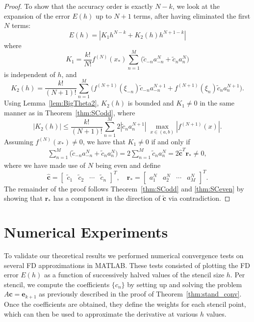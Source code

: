 \documentclass[12pt]{article}
\newcommand{\xstar}{x_*}
\newcommand{\rstar}{r_*}
\begin{document}
\begin{proof}
To show that the accuracy order is exactly $N-k$, we look at the expansion of the error $E(h)$ up to $N+1$ terms, after having eliminated the first $N$ terms:
\[
	E(h) = \left| K_1h^{N-k} + K_2(h)h^{N+1-k} \right|
\]
where
\[
	K_1 = \frac{k!}{N!}f^{(N)}(\xstar) \sum_{n=1}^M \Big( \tilde c_{-n} a_{-n}^N + \tilde c_n a_n^{N} \Big)
\]
is independent of $h$, and
\[
	K_2(h) = \frac{k!}{(N+1)!} \sum_{n=1}^{M} 
	\Big( 
		f^{(N+1)}(\xi_{-n})\tilde c_{-n}a_{-n}^{N+1} + 
		f^{(N+1)}(\xi_n)\tilde c_na_n^{N+1}
	\Big).
\]
Using Lemma~\ref{lem:BigTheta2}, $K_2(h)$ is bounded and $K_1\ne 0$ in the same manner as in Theorem~\ref{thm:SCodd}, where
\[
	|K_2(h)| \le \frac{k!}{(N+1)!}
	\sum_{n=1}^M 
		2|\tilde c_na_n^{N+1}| 
	\; \max_{x\in(a,b)}\left|f^{(N+1)}(x)\right|.
\]
Assuming $f^{(N)}(\xstar)\neq 0$, we have that $K_1\neq 0$ if and only if
\begin{align*}
	\sum_{n=1}^M \Big( \tilde c_{-n} a_{-n}^{N}  + \tilde c_n a_n^{N} \Big)
	= 2\sum_{n=1}^M \tilde c_n a_n^{N}
	= 2 \hat{\mathbf c}^T \mathbf \rstar
	\neq 0,
\end{align*}
where we have made use of $N$ being even and define
\[
	\hat{\mathbf c} = 
		\begin{bmatrix}
		\tilde c_1 & \tilde c_2&  \cdots & \tilde c_n
		\end{bmatrix}^T, \quad
	\mathbf \rstar = 
		\begin{bmatrix}
		a_1^N & a_2^N & \cdots & a_M^{N}
		\end{bmatrix}^T.
\]
The remainder of the proof follows Theorem~\ref{thm:SCodd} and \ref{thm:SCeven} by showing that $\mathbf \rstar$ has a component in the direction of $\tilde{\mathbf c}$ via contradiction.
\end{proof}



\section{Numerical Experiments}
\label{sec:experiments}

To validate our theoretical results we performed numerical convergence tests on several FD approximations in MATLAB. 
These tests consisted of plotting the FD error $E(h)$ as a function of successively halved values of the stencil size $h$. 
Per stencil, we compute the coefficients $\{c_n\}$ by setting up and solving the problem $A\mathbf c=\mathbf e_{k+1}$ as previously described in the proof of Theorem~\ref{thm:stand_conv}. 
Once the coefficients are obtained, they define the weights for each stencil point, which can then be used to approximate the derivative at various $h$ values. 
\end{document}
